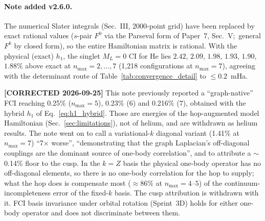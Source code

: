 \documentclass[aps,pra,twocolumn,superscriptaddress,longbibliography,floatfix]{revtex4-2}
\begin{document}
\paragraph{Note added v2.6.0.}
The numerical Slater integrals (Sec.~III, 2000-point grid) have been
replaced by exact rational values ($s$-pair $F^0$ via the Parseval form
of Paper~7, Sec.~V;\ general $F^k$ by closed form), so the entire Hamiltonian matrix is
rational.  With the physical (exact) $h_1$, the singlet $M_L = 0$ CI
for He lies $2.42$, $2.09$, $1.98$, $1.93$, $1.90$, $1.88\%$ above exact at $n_{\max} = 2,\dots,7$ (1,218
configurations at $n_{\max}=7$), agreeing with the determinant route of
Table~\ref{tab:convergence_detail} to $\le 0.2$~mHa.

\textbf{[CORRECTED 2026-09-25]} This note previously reported a
``graph-native'' FCI reaching 0.25\% ($n_{\max}=5$), 0.23\% ($6$) and
0.216\% ($7$), obtained with the hybrid $h_1$ of
Eq.~\eqref{eq:h1_hybrid}.  Those are energies of the hop-augmented model
Hamiltonian (Sec.~\ref{sec:limitations}), not of helium, and are
withdrawn as helium results.  The note went on to call a variational-$k$
diagonal variant (1.41\% at $n_{\max}=7$) ``7$\times$ worse'',
``demonstrating that the graph Laplacian's off-diagonal couplings are the
dominant source of one-body correlation'', and to attribute a
$\sim$0.14\% floor to the cusp.  In the $k=Z$ basis the physical
one-body operator has no off-diagonal elements, so there is no
one-body correlation for the hop to supply; what the hop does is
compensate most ($\approx 86\%$ at $n_{\max}=4$--$5$) of the
continuum-incompleteness error of the fixed-$k$ basis.  The cusp
attribution is withdrawn with it.  FCI basis invariance under orbital
rotation (Sprint~3D) holds for either one-body operator and does not
discriminate between them.
\end{document}
